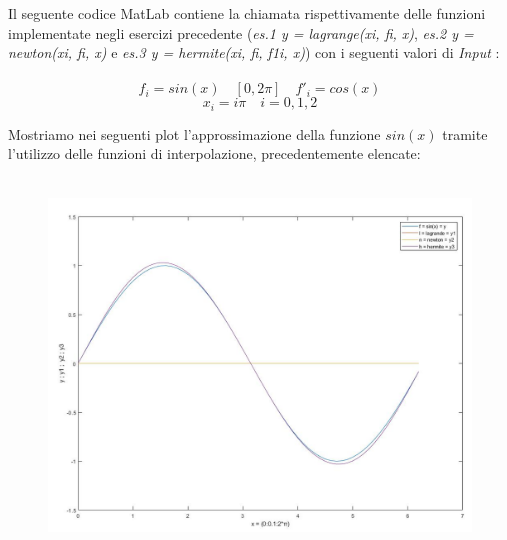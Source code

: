 Il seguente codice MatLab contiene la chiamata rispettivamente delle funzioni implementate negli esercizi precedente (\textit{es.1 y = lagrange(xi, fi, x)}, \textit{es.2 y = newton(xi, fi, x)} e \textit{es.3 y = hermite(xi, fi, f1i, x)}) con i seguenti valori di \textit{Input} :\\\ 
	\[
		f_i = sin(x) \quad [0,2\pi] \quad f'_i = cos(x)
	\]
	\[
		x_i = i\pi
		\quad
		i = 0,1,2
	\]
	
Mostriamo nei seguenti plot l'approssimazione della funzione $sin(x)$ tramite l'utilizzo delle funzioni di interpolazione, precedentemente elencate:\\\
	\begin{figure}[H]
		\centering
		\label{Cap4_Es_4}
			\includegraphics[width=\textwidth]{Plot/Cap_4_Es_4}
	\end{figure}